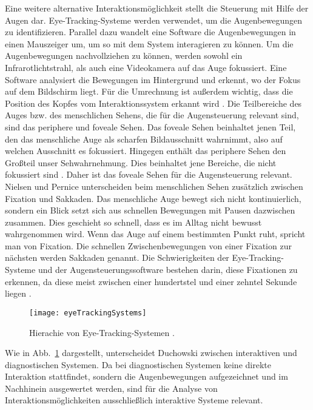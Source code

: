 Eine weitere alternative Interaktionsmöglichkeit stellt die Steuerung mit Hilfe der Augen dar. Eye-Tracking-Systeme werden verwendet, um die Augenbewegungen zu identifizieren. Parallel dazu wandelt eine Software die Augenbewegungen in einen Mauszeiger um, um so mit dem System interagieren zu können. 
\newline \newline
Um die Augenbewegungen nachvollziehen zu können, werden sowohl ein Infrarotlichtstrahl, als auch eine Videokamera auf das Auge fokussiert. Eine Software analysiert die Bewegungen im Hintergrund und erkennt, wo der Fokus auf dem Bildschirm liegt. Für die Umrechnung ist außerdem wichtig, dass die Position des Kopfes vom Interaktionssystem erkannt wird \cite{NielsenPernice}.
\newline \newline
Die Teilbereiche des Auges bzw. des menschlichen Sehens, die für die Augensteuerung relevant sind, sind das periphere und foveale Sehen. Das foveale Sehen beinhaltet jenen Teil, den das menschliche Auge als scharfen Bildausschnitt wahrnimmt, also auf \mbox{welchen} Ausschnitt es fokussiert. Hingegen enthält das periphere Sehen den Großteil unser Sehwahrnehmung. Dies beinhaltet jene Bereiche, die nicht fokussiert sind \cite{NielsenPernice}. Daher ist das foveale Sehen für die Augensteuerung relevant.
\newline \newline
Nielsen und Pernice \cite{NielsenPernice} unterscheiden beim menschlichen Sehen zusätzlich zwischen Fixation und Sakkaden. Das menschliche Auge bewegt sich nicht kontinuierlich, sondern ein Blick setzt sich aus schnellen Bewegungen mit Pausen dazwischen zusammen. Dies geschieht so schnell, dass es im Alltag nicht bewusst wahrgenommen wird. Wenn das Auge auf einem bestimmten Punkt ruht, spricht man von Fixation. Die schnellen Zwischenbewegungen von einer Fixation zur nächsten werden Sakkaden genannt. Die Schwierigkeiten der Eye-Tracking-Systeme und der Augensteuerungssoftware bestehen darin, diese Fixationen zu erkennen, da diese meist zwischen einer hundertstel und einer zehntel Sekunde liegen \cite{NielsenPernice}.
\begin{figure}
\centering
\texttt{[image: eyeTrackingSystems]}
\caption{Hierachie von Eye-Tracking-Systemen \cite{Duchowski}.}
\label{fig:eyeTrackingSystems}
\end{figure}
\newline \newline
Wie in Abb.~\ref{fig:eyeTrackingSystems} dargestellt, unterscheidet Duchowski \cite{Duchowski} zwischen interaktiven und \mbox{diagnostischen} Systemen. Da bei diagnostischen Systemen keine direkte Interaktion stattfindet, sondern die Augenbewegungen aufgezeichnet und im Nachhinein ausgewertet werden, sind für die Analyse von Interaktionsmöglichkeiten ausschließlich interaktive Systeme relevant. 
